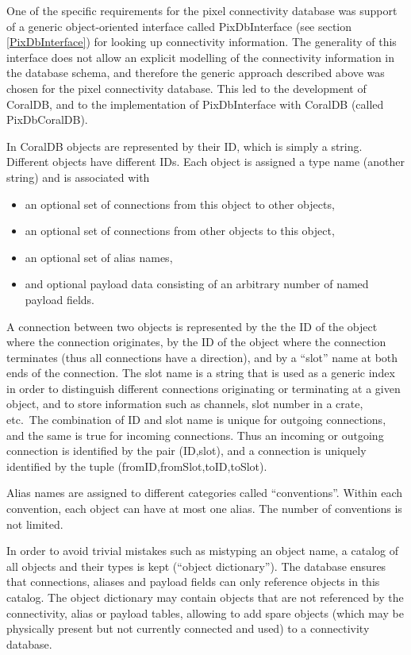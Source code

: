 One of the specific requirements for the pixel connectivity database
was support of a generic object-oriented interface called
PixDbInterface (see section \ref{PixDbInterface}) for looking up connectivity information. The generality
of this interface does not allow an explicit modelling of the
connectivity information in the database schema, and therefore the
generic approach described above was chosen for the pixel connectivity
database. This led to the development of CoralDB, and to the implementation
of PixDbInterface with CoralDB (called PixDbCoralDB).

In CoralDB objects are represented by their ID, which is simply a string.
Different objects have different IDs. Each object is assigned a type name
(another string) and is associated with
\begin{itemize}
\item an optional set of connections from this object to other objects,
\item an optional set of connections from other objects to this object,
\item an optional set of alias names,
\item and optional payload data consisting of an arbitrary number
of named payload fields.
\end{itemize}

A connection between two objects is represented by the
the ID of the object where the connection originates, by the ID of the object
where the connection terminates (thus all connections have a direction), and by
a ``slot'' name at both ends of the connection. The slot name is a string that
is used as a generic index in order to distinguish different connections originating
or terminating at a given object, and to store information such as channels, slot
number in a crate, etc.\ The combination of ID and slot name is unique for outgoing
connections, and the same is true for incoming connections. Thus an incoming or outgoing
connection is identified by the pair (ID,slot), and a connection is uniquely identified
by the tuple (fromID,fromSlot,toID,toSlot).

Alias names are assigned to different categories called ``conventions''. Within each convention,
each object can have at most one alias. The number of conventions is not limited.

In order to avoid trivial mistakes such as mistyping an object name, a catalog
of all objects and their types is kept (``object dictionary'').
The database ensures that connections, aliases and payload fields
can only reference objects in this catalog. The
object dictionary may contain objects that are not referenced by the connectivity,
alias or payload tables, allowing to add spare objects (which may be physically present but not
currently connected and used) to a connectivity database.

